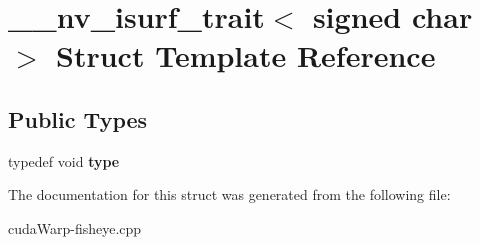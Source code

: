\hypertarget{struct____nv__isurf__trait_3_01signed_01char_01_4}{}\section{\+\_\+\+\_\+nv\+\_\+isurf\+\_\+trait$<$ signed char $>$ Struct Template Reference}
\label{struct____nv__isurf__trait_3_01signed_01char_01_4}
\subsection*{Public Types}
\begin{DoxyCompactItemize}
\item 
typedef void {\bfseries type}\hypertarget{struct____nv__isurf__trait_3_01signed_01char_01_4_a6391ec848f1ceb80bc2757cb5d2ec824}{}\label{struct____nv__isurf__trait_3_01signed_01char_01_4_a6391ec848f1ceb80bc2757cb5d2ec824}

\end{DoxyCompactItemize}


The documentation for this struct was generated from the following file\+:\begin{DoxyCompactItemize}
\item 
cuda\+Warp-\/fisheye.\+cpp\end{DoxyCompactItemize}

